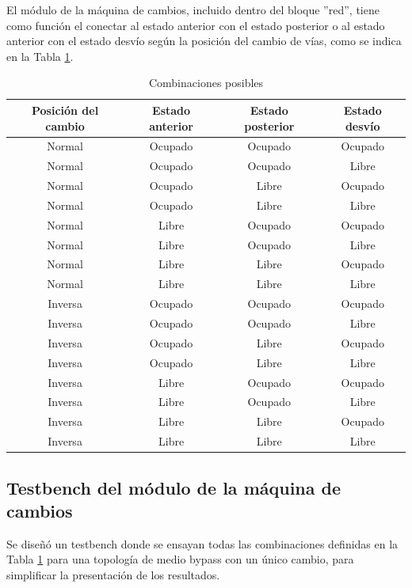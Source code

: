 	El módulo de la máquina de cambios, incluido dentro del bloque ''red'', tiene como función el conectar al estado anterior con el estado posterior o al estado anterior con el estado desvío según la posición del cambio de vías, como se indica en la Tabla \ref{tabla_cambios}.
	
			\begin{table}[!hbt]
			\renewcommand{\arraystretch}{1.3}
			\caption{Combinaciones posibles}
			\label{tabla_cambios}
			\centering
			\begin{tabular}{ c  c  c  c}
			\hline
			Posición del cambio & Estado anterior & Estado posterior & Estado desvío \\	
			\hline
			Normal & Ocupado & Ocupado  & Ocupado \\
			Normal & Ocupado & Ocupado  & Libre \\
			Normal & Ocupado & Libre  & Ocupado \\
			Normal & Ocupado & Libre  & Libre \\
			Normal & Libre & Ocupado  & Ocupado \\
			Normal & Libre & Ocupado  & Libre \\
			Normal & Libre & Libre  & Ocupado \\
			Normal & Libre & Libre  & Libre \\
			Inversa & Ocupado & Ocupado  & Ocupado \\
			Inversa & Ocupado & Ocupado  & Libre \\
			Inversa & Ocupado & Libre  & Ocupado \\
			Inversa & Ocupado & Libre  & Libre \\
			Inversa & Libre & Ocupado  & Ocupado \\
			Inversa & Libre & Ocupado  & Libre \\
			Inversa & Libre & Libre  & Ocupado \\
			Inversa & Libre & Libre  & Libre \\	
			\end{tabular}
			\end{table}	
	
	\subsection{Testbench del módulo de la máquina de cambios}
			
		Se diseñó un testbench donde se ensayan todas las combinaciones definidas en la Tabla \ref{tabla_cambios} para una topología de medio bypass con un único cambio, para simplificar la presentación de los resultados.
						
